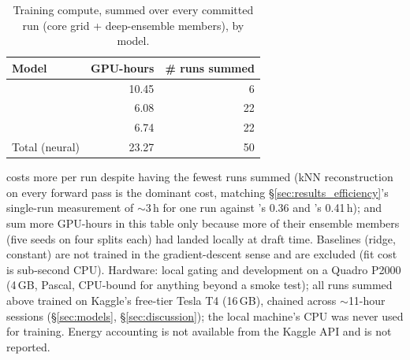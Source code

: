 \documentclass[11pt,a4paper]{article}
\begin{document}
\begin{table}[h]
  \centering
  \caption{Training compute, summed over every committed run
    (core grid + deep-ensemble members), by model.}
  \label{tab:app_compute}
  \begin{tabular}{lrr}
    \toprule
    Model & GPU-hours & \# runs summed \\
    \midrule
    \Mgnn{}      & 10.45 & 6  \\
    \Mfno{}      & 6.08  & 22 \\
    \Mtrans{}    & 6.74  & 22 \\
    \midrule
    Total (neural)  & 23.27 & 50 \\
    \bottomrule
  \end{tabular}
\end{table}

\Mgnn{} costs more per run despite having the fewest runs summed
(kNN reconstruction on every forward pass is the dominant cost, matching
\S\ref{sec:results_efficiency}'s single-run measurement of $\sim$3\,\si{\hour}
for one \Mgnn{}  run against \Mfno's 0.36 and \Mtrans's
0.41\,\si{\hour}); \Mfno{} and \Mtrans{} sum more GPU-hours in this table only
because more of their ensemble members (five seeds on four splits each) had
landed locally at draft time. Baselines (ridge, constant) are not trained in
the gradient-descent sense and are excluded (fit cost is sub-second CPU).
Hardware: local gating and development on a Quadro P2000 (4\,GB, Pascal,
CPU-bound for anything beyond a smoke test); all runs summed above trained on
Kaggle's free-tier Tesla T4 (16\,GB), chained across $\sim$11-hour sessions
(\S\ref{sec:models}, \S\ref{sec:discussion}); the local machine's CPU was never
used for training. Energy accounting is not available from the Kaggle API and
is not reported.
\end{document}
